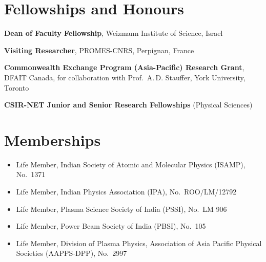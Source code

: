 \documentclass[11pt,a4paper]{article}
\newcommand{\sectionnb}[1]{\section*{#1}}   %
\newlength{\datew}\setlength{\datew}{2.75cm}
\newcommand{\dated}[2]{%
  \begin{list}{}{\setlength{\leftmargin}{\datew}\setlength{\labelwidth}{\datew}%
    \setlength{\labelsep}{0pt}\setlength{\topsep}{0pt}\setlength{\partopsep}{0pt}%
    \setlength{\itemsep}{0pt}\setlength{\parsep}{0pt}}
  \item[{\makebox[\datew][l]{\small\color{Muted}#1}}]#2
  \end{list}\vspace{3.5pt}}
\begin{document}
\sectionnb{Fellowships and Honours}
\dated{2018}{\textbf{Dean of Faculty Fellowship}, Weizmann Institute of Science, Israel}
\dated{2014}{\textbf{Visiting Researcher}, PROMES-CNRS, Perpignan, France}
\dated{2010}{\textbf{Commonwealth Exchange Program (Asia-Pacific) Research Grant}, DFAIT Canada, for collaboration with Prof.\ A.\,D. Stauffer, York University, Toronto}
\dated{July, 2007}{\textbf{CSIR-NET Junior and Senior Research Fellowships} (Physical Sciences)}

\sectionnb{Memberships}
\begin{itemize}[leftmargin=1.2em,itemsep=1pt,topsep=2pt,label={\color{Accent}\small\textbullet}]
  \item Life Member, Indian Society of Atomic and Molecular Physics (ISAMP), No.\ 1371
  \item Life Member, Indian Physics Association (IPA), No.\ ROO/LM/12792
  \item Life Member, Plasma Science Society of India (PSSI), No.\ LM 906
  \item Life Member, Power Beam Society of India (PBSI), No.\ 105
  \item Life Member, Division of Plasma Physics, Association of Asia Pacific Physical Societies (AAPPS-DPP), No.\ 2997
\end{itemize}
\end{document}
